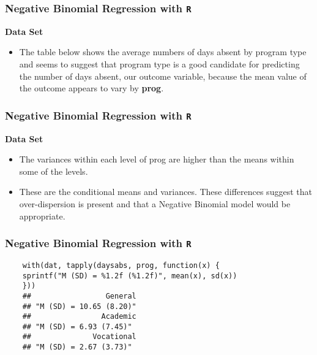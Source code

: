 \documentclass[MASTER.tex]{subfiles}
\begin{document}
\begin{frame}[fragile]
	\frametitle{Negative Binomial Regression with \texttt{R} }
	\Large
\textbf{Data Set}
\begin{itemize}
\item The table below shows the average numbers of days absent by program type and seems to 
	suggest that program type is a good candidate for predicting the number of days absent, our outcome variable, 
	because the mean value of the outcome appears to vary by \textbf{prog}. 
	\end{itemize}
\end{frame}
\begin{frame}[fragile]
	\frametitle{Negative Binomial Regression with \texttt{R} }
	\Large
\textbf{Data Set}
\begin{itemize}	
\item The variances within each level of prog are higher than the means within some of the levels. 
\item These are the conditional means and variances. These differences suggest that over-dispersion is present and 
that a Negative Binomial model would be appropriate.
\end{itemize}
\end{frame}
\begin{frame}[fragile]
	\frametitle{Negative Binomial Regression with \texttt{R} }
	\large
		\begin{verbatim}
	with(dat, tapply(daysabs, prog, function(x) {
	sprintf("M (SD) = %1.2f (%1.2f)", mean(x), sd(x))
	}))
	##                 General                           
	## "M (SD) = 10.65 (8.20)"  
	##                Academic  
	## "M (SD) = 6.93 (7.45)" 
	##              Vocational 
	## "M (SD) = 2.67 (3.73)"
	\end{verbatim}
	\end{frame}
\end{document}
